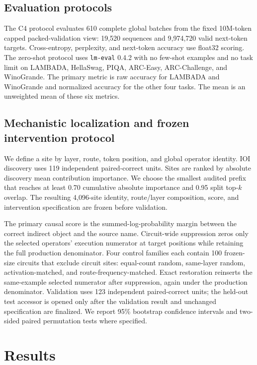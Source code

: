 \documentclass{article}
\begin{document}
\subsection{Evaluation protocols}

The C4 protocol evaluates 610 complete global batches from the fixed
10M-token capped packed-validation view: 19,520 sequences and 9,974,720 valid
next-token targets. Cross-entropy, perplexity, and next-token accuracy use
float32 scoring. The zero-shot protocol uses \texttt{lm-eval} 0.4.2 with no
few-shot examples and no task limit on LAMBADA, HellaSwag, PIQA, ARC-Easy,
ARC-Challenge, and WinoGrande. The primary metric is raw accuracy for LAMBADA
and WinoGrande and normalized accuracy for the other four tasks. The mean is
an unweighted mean of these six metrics.

\subsection{Mechanistic localization and frozen intervention protocol}
\label{sec:protocol}

We define a site by layer, route, token position, and global operator identity.
IOI discovery uses 119 independent paired-correct units. Sites are ranked by
absolute discovery mean contribution importance. We choose the smallest
audited prefix that reaches at least 0.70 cumulative absolute importance and
0.95 split top-\(k\) overlap. The resulting 4,096-site identity, route/layer
composition, score, and intervention specification are frozen before
validation.

The primary causal score is the summed-log-probability margin between the
correct indirect object and the source name. Circuit-wide suppression zeros
only the selected operators' execution numerator at target positions while
retaining the full production denominator. Four control families each contain
100 frozen-size circuits that exclude circuit sites: equal-count random,
same-layer random, activation-matched, and route-frequency-matched. Exact
restoration reinserts the same-example selected numerator after suppression,
again under the production denominator. Validation uses 123 independent
paired-correct units; the held-out test accessor is opened only after the
validation result and unchanged specification are finalized. We report 95\%
bootstrap confidence intervals and two-sided paired permutation tests where
specified.

\section{Results}
\label{sec:results}
\end{document}
